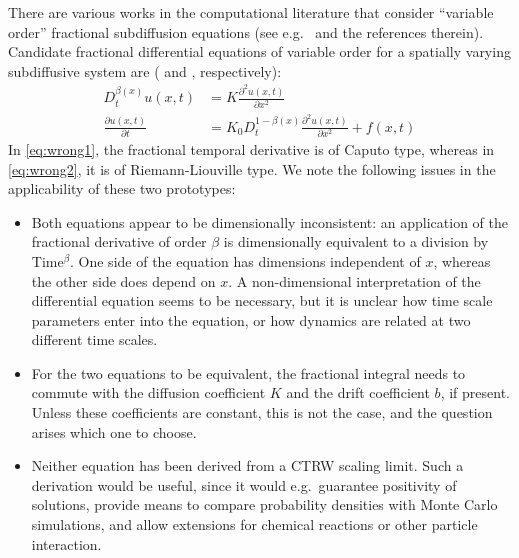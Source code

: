 \documentclass[a4paper,12pt]{elsarticle}
\numberwithin{equation}{section}
\theoremstyle{plain}
\theoremstyle{definition}
\theoremstyle{remark}
\numberwithin{equation}{section}
\newcommand{\1}{\mathbf 1}
\begin{document}
There are various works in the computational literature that consider ``variable
order'' fractional subdiffusion equations (see e.g.\ \cite{Chen2010,Sun2009} and
the references therein). Candidate fractional differential equations of
variable order for a spatially varying subdiffusive system are
(\cite[Eq.(8)]{Sun2009} and \cite[Eq.(1.2)]{Chen2010}, respectively):
\begin{align}
\label{eq:wrong1}
  D_t^{\beta(x)} u(x,t) &= K \frac{\partial^2 u(x,t)}{\partial x^2}
  \\
  \label{eq:wrong2}
  \frac{\partial u(x,t)}{\partial t} &= K {_0 D_t^{1-\beta(x)}}
  \frac{\partial^2 u(x,t)}{\partial x^2} + f(x,t)
\end{align}
In \eqref{eq:wrong1}, the fractional temporal derivative is of Caputo type,
whereas in \eqref{eq:wrong2}, it is of Riemann-Liouville type.
We note the following issues in the applicability of these two prototypes:
\begin{itemize}
  \item
  Both equations appear to be dimensionally inconsistent: an application of the
  fractional derivative of order $\beta$ is dimensionally equivalent to a
  division by Time$^{\beta}$. One side of the equation has dimensions
  independent of $x$, whereas the other side does depend on $x$.  A
  non-dimensional interpretation of the differential equation seems to be
  necessary, but it is unclear how time scale parameters enter into the
  equation, or how dynamics are related at two different time scales.
  \item
  For the two equations to be equivalent, the fractional integral needs to
  commute with the diffusion coefficient $K$ and the drift coefficient $b$,
  if present.  Unless these coefficients are constant, this is not the case,
  and the question arises which one to choose.
  \item
  Neither equation has been derived from a CTRW scaling limit. Such a derivation
  would be useful, since it would e.g.\ guarantee positivity of solutions,
  provide means to compare probability densities with Monte Carlo simulations,
  and allow extensions for chemical reactions or other particle interaction.
\end{itemize}
\end{document}
